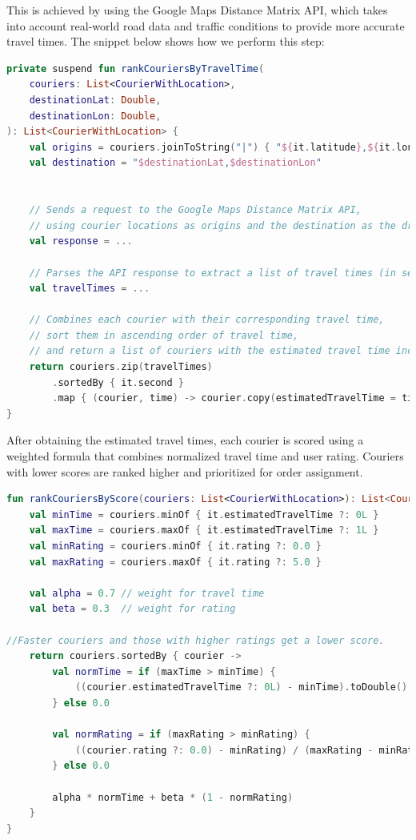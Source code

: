 This is achieved by using the Google Maps Distance Matrix API, which takes into account real-world road data and traffic conditions to provide more accurate travel times. The snippet below shows how we perform this step:

\begin{lstlisting}[language=Kotlin, caption={Ranking couriers by travel time using Google Maps API}]
private suspend fun rankCouriersByTravelTime(
    couriers: List<CourierWithLocation>,
    destinationLat: Double,
    destinationLon: Double,
): List<CourierWithLocation> {
    val origins = couriers.joinToString("|") { "${it.latitude},${it.longitude}" }
    val destination = "$destinationLat,$destinationLon"
    

    // Sends a request to the Google Maps Distance Matrix API,
    // using courier locations as origins and the destination as the drop-off point.
    val response = ...
    
    // Parses the API response to extract a list of travel times (in seconds), where each value corresponds to a courier in the original list.
    val travelTimes = ...

    // Combines each courier with their corresponding travel time,
    // sort them in ascending order of travel time,
    // and return a list of couriers with the estimated travel time included.
    return couriers.zip(travelTimes)
        .sortedBy { it.second }
        .map { (courier, time) -> courier.copy(estimatedTravelTime = time) }
}
\end{lstlisting}

After obtaining the estimated travel times, each courier is scored using a weighted formula that combines normalized travel time and user rating. Couriers with lower scores are ranked higher and prioritized for order assignment.

\begin{lstlisting}[language=Kotlin, caption={Scoring couriers by travel time and rating}]
fun rankCouriersByScore(couriers: List<CourierWithLocation>): List<CourierWithLocation> {
    val minTime = couriers.minOf { it.estimatedTravelTime ?: 0L }
    val maxTime = couriers.maxOf { it.estimatedTravelTime ?: 1L }
    val minRating = couriers.minOf { it.rating ?: 0.0 }
    val maxRating = couriers.maxOf { it.rating ?: 5.0 }

    val alpha = 0.7 // weight for travel time
    val beta = 0.3  // weight for rating

//Faster couriers and those with higher ratings get a lower score.
    return couriers.sortedBy { courier ->
        val normTime = if (maxTime > minTime) {
            ((courier.estimatedTravelTime ?: 0L) - minTime).toDouble() / (maxTime - minTime)
        } else 0.0

        val normRating = if (maxRating > minRating) {
            ((courier.rating ?: 0.0) - minRating) / (maxRating - minRating)
        } else 0.0

        alpha * normTime + beta * (1 - normRating)
    }
}
\end{lstlisting}

